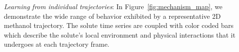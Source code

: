 \documentclass[journal=jpcbfk,manuscript=article]{achemso}
\begin{document}
  \textit{Learning from individual trajectories}: In Figure~\ref{fig:mechanism_map}, 
  we demonstrate the wide range of behavior exhibited by a representative 2D methanol
  trajectory.
  The solute time series are coupled with color coded bars which describe the solute's
  local environment and physical interactions that it undergoes at each trajectory frame. 
\end{document}
